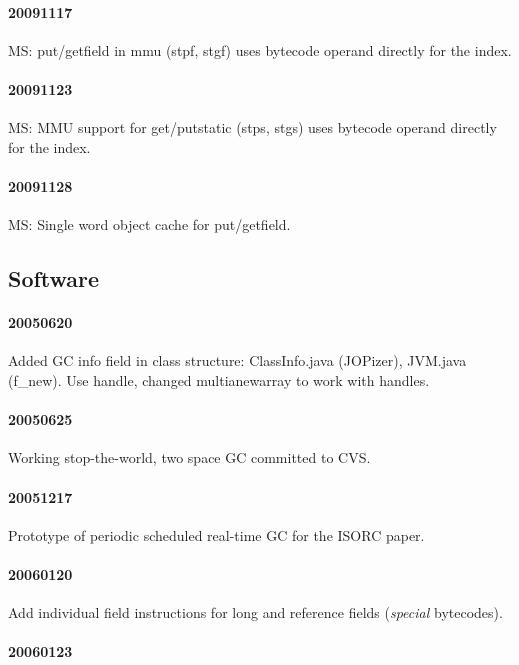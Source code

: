 \documentclass[a4paper,12pt]{scrartcl}
\newcommand{\code}[1]{{\textsf{#1}}}
\begin{document}
\paragraph{20091117} MS: put/getfield in mmu (\code{stpf}, \code{stgf})
uses bytecode operand directly for the index.

\paragraph{20091123} MS: MMU support for get/putstatic (\code{stps}, \code{stgs})
uses bytecode operand directly for the index.

\paragraph{20091128} MS: Single word object cache for put/getfield.

\subsection{Software}

\paragraph{20050620}

Added GC info field in class structure: ClassInfo.java (JOPizer),
JVM.java (f\_new). Use handle, changed multianewarray to work with
handles.

\paragraph{20050625}

Working stop-the-world, two space GC committed to CVS.

\paragraph{20051217}

Prototype of periodic scheduled real-time GC for the ISORC paper.

\paragraph{20060120}

Add individual field instructions for long and reference fields
(\emph{special} bytecodes).

\paragraph{20060123}
\end{document}
